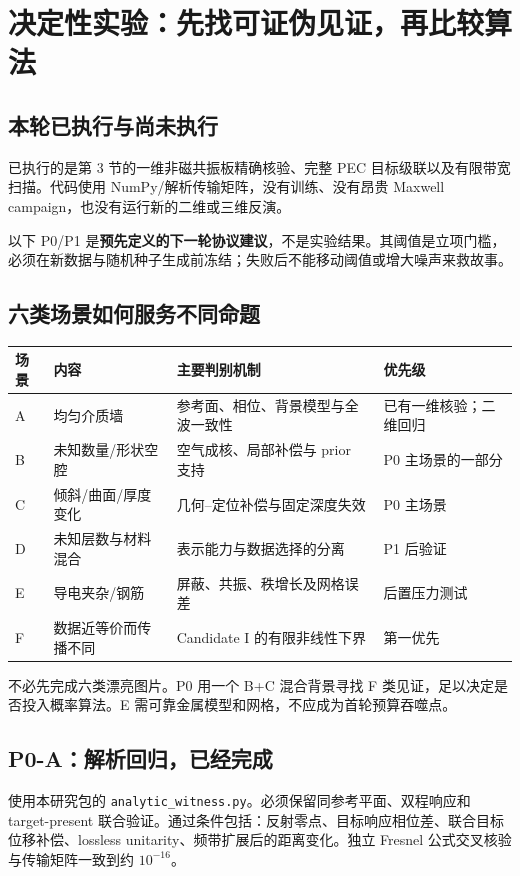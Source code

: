 \section{决定性实验：先找可证伪见证，再比较算法}
\subsection{本轮已执行与尚未执行}
已执行的是第 3 节的一维非磁共振板精确核验、完整 PEC 目标级联以及有限带宽扫描。代码使用 NumPy/解析传输矩阵，没有训练、没有昂贵 Maxwell campaign，也没有运行新的二维或三维反演。

以下 P0/P1 是\textbf{预先定义的下一轮协议建议}，不是实验结果。其阈值是立项门槛，必须在新数据与随机种子生成前冻结；失败后不能移动阈值或增大噪声来救故事。

\subsection{六类场景如何服务不同命题}
\begin{longtable}{p{12mm}p{41mm}p{58mm}p{31mm}}
\toprule
场景 & 内容 & 主要判别机制 & 优先级\\
\midrule
A & 均匀介质墙 & 参考面、相位、背景模型与全波一致性 & 已有一维核验；二维回归\\
B & 未知数量/形状空腔 & 空气成核、局部补偿与 prior 支持 & P0 主场景的一部分\\
C & 倾斜/曲面/厚度变化 & 几何--定位补偿与固定深度失效 & P0 主场景\\
D & 未知层数与材料混合 & 表示能力与数据选择的分离 & P1 后验证\\
E & 导电夹杂/钢筋 & 屏蔽、共振、秩增长及网格误差 & 后置压力测试\\
F & 数据近等价而传播不同 & Candidate I 的有限非线性下界 & 第一优先\\
\bottomrule
\end{longtable}
不必先完成六类漂亮图片。P0 用一个 B+C 混合背景寻找 F 类见证，足以决定是否投入概率算法。E 需可靠金属模型和网格，不应成为首轮预算吞噬点。

\subsection{P0-A：解析回归，已经完成}
使用本研究包的 \texttt{analytic\_witness.py}。必须保留同参考平面、双程响应和 target-present 联合验证。通过条件包括：反射零点、目标响应相位差、联合目标位移补偿、lossless unitarity、频带扩展后的距离变化。独立 Fresnel 公式交叉核验与传输矩阵一致到约 $10^{-16}$。

